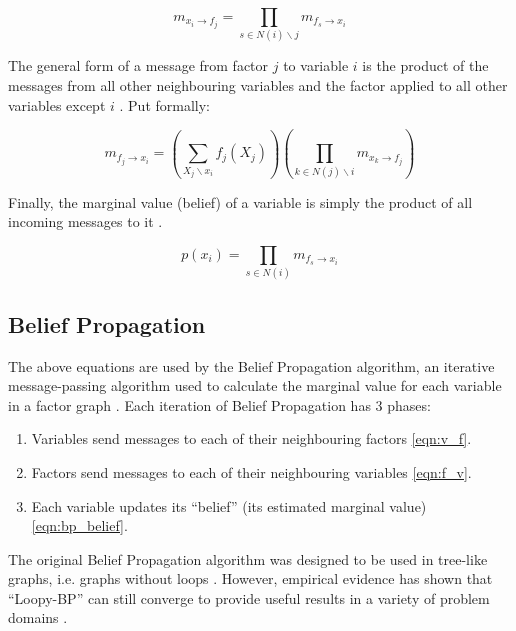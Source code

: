 \begin{equation}
    m_{x_i \rightarrow f_j} = \underset{s \in N(i) \backslash j }{\prod} m_{f_s \rightarrow x_i}
    \label{eqn:v_f}
\end{equation}

The general form of a message from factor $j$ to variable $i$ is the product of the messages from all other neighbouring variables and the factor applied to all other variables except $i$ \cite{GaussianBP}. Put formally:

\begin{equation}
    m_{f_j \rightarrow x_i} = \left(\underset{X_j \backslash x_i}{\sum} f_j(X_j)\right) \left(\underset{k \in N(j) \backslash i}{\prod} m_{x_k \rightarrow f_j}\right)
    \label{eqn:f_v}
\end{equation}

Finally, the marginal value (belief) of a variable is simply the product of all incoming messages to it \cite{GaussianBP}.

\begin{equation}
    p(x_i) = \underset{s \in N(i)}{\prod} m_{f_s \rightarrow x_i}
    \label{eqn:bp_belief}
\end{equation}

\subsection{Belief Propagation}
The above equations are used by the Belief Propagation algorithm, an iterative message-passing algorithm used to calculate the marginal value for each variable in a factor graph \cite{GaussianBP}. Each iteration of Belief Propagation has 3 phases:

\begin{enumerate}
    \item Variables send messages to each of their neighbouring factors \ref{eqn:v_f}.
    \item Factors send messages to each of their neighbouring variables \ref{eqn:f_v}.
    \item Each variable updates its ``belief'' (its estimated marginal value) \ref{eqn:bp_belief}.
\end{enumerate}

The original Belief Propagation algorithm was designed to be used in tree-like graphs, i.e. graphs without loops \cite{GaussianBP}. However, empirical evidence has shown that ``Loopy-BP'' can still converge to provide useful results in a variety of problem domains \cite{GaussianBP}. %

